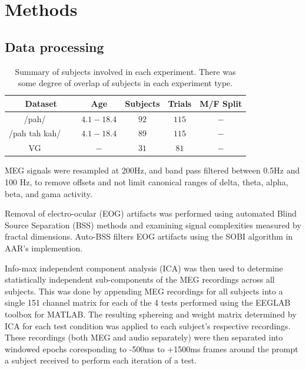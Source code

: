 \documentclass[a4paper]{article}
\begin{document}
\section{Methods}


\subsection{Data processing}

\begin{table}[t]
  \caption{Summary of subjects involved in each experiment. There was some degree of overlap of subjects in each experiment type.}
  \label{tab:subjects}
  \centering
  \begin{tabular}{ c@{}c c c c }
    \toprule
    \multicolumn{1}{c}{\textbf{Dataset}} & \multicolumn{1}{c}{\textbf{Age}} & \multicolumn{1}{c}{\textbf{Subjects}} & \multicolumn{1}{c}{\textbf{Trials}}  & \multicolumn{1}{c}{\textbf{M/F Split}} \\
    \midrule
    /pah/~~~                    & $4.1-18.4$   &   $92$   &   $115$   &   $-$ \\
    /pah tah kah/~~~                & $4.1-18.4$   &   $89$   &   $115$   &   $-$ \\
    VG~~~                      & $-$   &   $31$   &   $81$    &   $-$  \\
    \bottomrule
  \end{tabular}
\end{table}

MEG signals were resampled at 200Hz, and band pass filtered between 0.5Hz and 100 Hz, to remove offsets and not limit canonical ranges of delta, theta, alpha, beta, and gama activity.

Removal of electro-ocular (EOG) artifacts was performed using automated Blind Source Separation (BSS) methods and examining signal complexities measured by fractal dimensions. Auto-BSS filters EOG artifacts using the SOBI algorithm in AAR's implemention.

Info-max independent component analysis (ICA) \cite{Bell1995} was then used to determine statistically independent sub-components of the MEG recordings across all subjects. This was done by appending MEG recordings for all subjects into a single 151 channel matrix for each of the 4 tests performed using the EEGLAB toolbox \cite{Delorme04eeglab} for MATLAB. The resulting sphereing and weight matrix determined by ICA for each test condition was applied to each subject's respective recordings. These recordings (both MEG and audio separately) were then separated into windowed epochs coresponding to -500ms to +1500ms frames around the prompt a subject received to perform each iteration of a test.
\end{document}
